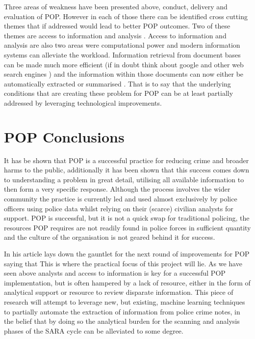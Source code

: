 Three areas of weakness have been presented above, conduct, delivery and evaluation of POP. However in each of those there can be identified cross cutting themes that if addressed would lead to better POP outcomes. Two of these themes are access to information and analysis \parencite{POPUCL}. Access to information and analysis are also two areas were computational power and modern information systems can alleviate the workload. Information retrieval from document bases can be made much more efficient (if in doubt think about google and other web search engines \parencite{manning2008introduction}) and the information within those documents can now either be automatically extracted or summarised \parencite{kumar2011natural}. That is to say that the underlying conditions that are creating these problem for POP can be at least partially addressed by leveraging technological improvements.

\section{POP Conclusions}


It has be shown that POP is a successful practice for reducing crime and broader harms to the public, additionally it has been shown that this success comes down to understanding a problem in great detail, utilising all available information to then form a very specific response. Although the process involves the wider community the practice is currently led and used almost exclusively by police officers using police data whilst relying on their (scarce) civilian analysts for support. POP is successful, but it is not a quick swap for traditional policing, the resources POP requires are not readily found in police forces in sufficient quantity and the culture of the organisation is not geared behind it for success.  

In his article \textcite{whitherpop}  lays down the gauntlet for the next round of improvements for POP saying that   This is where the practical focus of this project will lie. As we have seen above analysts and access to information is key for a successful POP implementation, but is often hampered by a lack of resource, either in the form of analytical support or resource to review disparate information. This piece of research will attempt to leverage new, but existing, machine learning techniques to partially automate the extraction of information from police crime notes, in the belief that by doing so the analytical burden for the scanning and analysis phases of the SARA cycle can be alleviated to some degree.